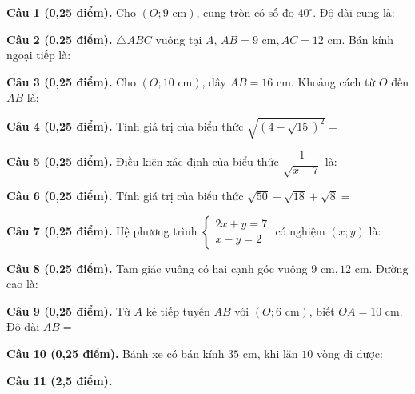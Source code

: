 \documentclass[12pt,a4paper]{article}
\begin{document}
\vspace{1.2mm}
\noindent\textbf{Câu 1 (0,25 điểm).} Cho $(O; 9\text{ cm})$, cung tròn có số đo $40^\circ$. Độ dài cung là: \par\vspace{0.8mm}
\noindent\textbf{Câu 2 (0,25 điểm).} $\triangle ABC$ vuông tại $A$, $AB = 9\text{ cm}, AC = 12\text{ cm}$. Bán kính ngoại tiếp là: \par\vspace{0.8mm}
\noindent\textbf{Câu 3 (0,25 điểm).} Cho $(O; 10\text{ cm})$, dây $AB = 16\text{ cm}$. Khoảng cách từ $O$ đến $AB$ là: \par\vspace{0.8mm}
\noindent\textbf{Câu 4 (0,25 điểm).} Tính giá trị của biểu thức $\sqrt{(4 - \sqrt{15})^2} = $ \par\vspace{0.8mm}
\noindent\textbf{Câu 5 (0,25 điểm).} Điều kiện xác định của biểu thức $\dfrac{1}{\sqrt{x - 7}}$ là: \par\vspace{0.8mm}
\noindent\textbf{Câu 6 (0,25 điểm).} Tính giá trị của biểu thức $\sqrt{50} - \sqrt{18} + \sqrt{8} = $ \par\vspace{0.8mm}
\noindent\textbf{Câu 7 (0,25 điểm).} Hệ phương trình $\begin{cases} 2x + y = 7 \\ x - y = 2 \end{cases}$ có nghiệm $(x; y)$ là: \par\vspace{0.8mm}
\noindent\textbf{Câu 8 (0,25 điểm).} Tam giác vuông có hai cạnh góc vuông $9\text{ cm}, 12\text{ cm}$. Đường cao là: \par\vspace{0.8mm}
\noindent\textbf{Câu 9 (0,25 điểm).} Từ $A$ kẻ tiếp tuyến $AB$ với $(O; 6\text{ cm})$, biết $OA = 10\text{ cm}$. Độ dài $AB = $ \par\vspace{0.8mm}
\noindent\textbf{Câu 10 (0,25 điểm).} Bánh xe có bán kính $35\text{ cm}$, khi lăn $10$ vòng đi được: \par\vspace{0.8mm}
\vspace{0.6mm}
\noindent\textbf{Câu 11 (2,5 điểm).}
\vspace{0.6mm}
\end{document}
